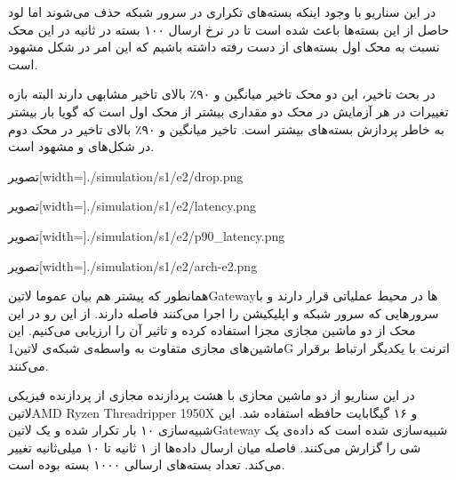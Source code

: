 در این سناریو با وجود اینکه بسته‌های تکراری در سرور شبکه حذف می‌شوند اما لود حاصل از این بسته‌ها باعث شده است تا در نرخ ارسال ۱۰۰ بسته در ثانیه
در این محک نسبت به محک اول بسته‌های از دست رفته داشته باشیم که این امر در شکل 
مشهود است.

در بحث تاخیر، این دو محک تاخیر میانگین و ۹۰٪ بالای تاخیر مشابهی دارند البته بازه تغییرات در هر آزمایش در محک دو مقداری بیشتر از محک اول است
که گویا بار بیشتر به خاطر پردازش بسته‌های بیشتر است. تاخیر میانگین و ۹۰٪ بالای تاخیر در محک دوم در شکل‌های 
و 
مشهود است.

‌تصویر[width=\textwidth]{./simulation/s1/e2/drop.png}

‌تصویر[width=\textwidth]{./simulation/s1/e2/latency.png}

‌تصویر[width=\textwidth]{./simulation/s1/e2/p90_latency.png}

‌تصویر[width=\textwidth]{./simulation/s1/e2/arch-e2.png}



همانطور که پیشتر هم بیان عموما ‌لاتین{Gateway}ها در محیط عملیاتی قرار دارند و با سرورهایی که سرور شبکه
و اپلیکیشن را اجرا می‌کنند فاصله دارند. از این رو در این محک از دو ماشین مجازی مجزا استفاده کرده و تاثیر آن را ارزیابی می‌کنیم.
این ماشین‌های مجازی متفاوت به واسطه‌ی شبکه‌ی ‌لاتین{1G} اترنت با یکدیگر ارتباط برقرار می‌کنند.

در این سناریو از دو ماشین محازی با هشت پردازنده مجازی از پردازنده فیزیکی
‌لاتین{AMD Ryzen Threadripper 1950X}
و ۱۶ گیگابایت حافظه استفاده شد.
این شبیه‌سازی ۱۰ بار تکرار شده
و یک ‌لاتین{Gateway} شبیه‌سازی شده است که داده‌ی یک شی را گزارش می‌کنند. فاصله میان ارسال داده‌ها از ۱ ثانیه تا ۱۰ میلی‌ثانیه تغییر می‌کند.
تعداد بسته‌های ارسالی ۱۰۰۰ بسته بوده است.

